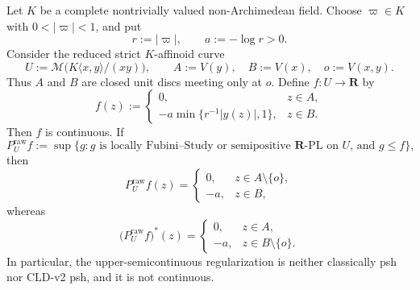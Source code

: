 \begin{proposition}
\label{prop:ch15-nodal-local-envelope}
Let $K$ be a complete nontrivially valued non-Archimedean field.  Choose
$\varpi\in K$ with $0<|\varpi|<1$, and put
\[
                  r:=|\varpi|,
          \qquad  a:=-\log r>0.
\]
Consider the reduced strict $K$-affinoid curve
\[
 U:=\mathcal M\bigl(K\langle x,y\rangle/(xy)\bigr),
 \qquad
 A:=V(y),\quad B:=V(x),\quad o:=V(x,y).
\]
Thus $A$ and $B$ are closed unit discs meeting only at $o$.  Define
$f:U\to\mathbf R$ by
\begin{equation}
\label{eq:ch15-nodal-obstacle}
 f(z):=
 \begin{cases}
  0,
       & z\in A,\\[2mm]
  -a\min\{r^{-1}|y(z)|,1\},
       & z\in B.
 \end{cases}
\end{equation}
Then $f$ is continuous.  If
\[
 P_U^{\mathrm{raw}}f
 :=\sup\{g:g\text{ is locally Fubini--Study or semipositive
                    $\mathbf R$-PL on $U$, and }g\leq f\},
\]
then
\begin{equation}
\label{eq:ch15-nodal-raw-envelope}
 P_U^{\mathrm{raw}}f(z)=
 \begin{cases}
  0,  &z\in A\setminus\{o\},\\
  -a, &z\in B,
 \end{cases}
\end{equation}
whereas
\begin{equation}
\label{eq:ch15-nodal-regularized-envelope}
 \bigl(P_U^{\mathrm{raw}}f\bigr)^*(z)=
 \begin{cases}
  0,  &z\in A,\\
  -a, &z\in B\setminus\{o\}.
 \end{cases}
\end{equation}
In particular, the upper-semicontinuous regularization is neither
classically psh nor CLD-v2 psh, and it is not continuous.
\end{proposition}

